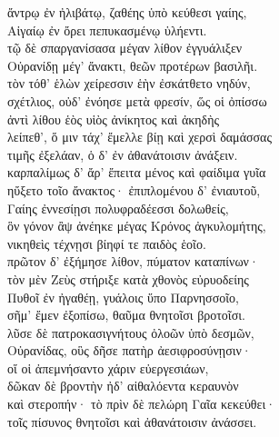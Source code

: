 \begin{pages}
\begin{Leftside}
ἄντρῳ ἐν ἠλιβάτῳ, ζαθέης ὑπὸ κεύθεσι γαίης,\\
Αἰγαίῳ ἐν ὄρει πεπυκασμένῳ ὑλήεντι.\\
τῷ δὲ σπαργανίσασα μέγαν λίθον ἐγγυάλιξεν \\
Οὐρανίδῃ μέγ' ἄνακτι, θεῶν προτέρων βασιλῆι.\\
τὸν τόθ' ἑλὼν χείρεσσιν ἑὴν ἐσκάτθετο νηδύν, \\
σχέτλιος, οὐδ' ἐνόησε μετὰ φρεσίν, ὥς οἱ ὀπίσσω \\
ἀντὶ λίθου ἑὸς υἱὸς ἀνίκητος καὶ ἀκηδὴς\\
λείπεθ', ὅ μιν τάχ' ἔμελλε βίῃ καὶ χερσὶ δαμάσσας \\
τιμῆς ἐξελάαν, ὁ δ' ἐν ἀθανάτοισιν ἀνάξειν. \\

\quad{}καρπαλίμως δ' ἄρ' ἔπειτα μένος καὶ φαίδιμα γυῖα\\
ηὔξετο τοῖο ἄνακτος· ἐπιπλομένου δ' ἐνιαυτοῦ, \\
Γαίης ἐννεσίῃσι πολυφραδέεσσι δολωθείς, \\
ὃν γόνον ἂψ ἀνέηκε μέγας Κρόνος ἀγκυλομήτης,  \\
νικηθεὶς τέχνῃσι βίηφί τε παιδὸς ἑοῖο.\\
πρῶτον δ' ἐξήμησε λίθον, πύματον καταπίνων·\\
τὸν μὲν Ζεὺς στήριξε κατὰ χθονὸς εὐρυοδείης\\
Πυθοῖ ἐν ἠγαθέῃ, γυάλοις ὕπο Παρνησσοῖο, \\
σῆμ' ἔμεν ἐξοπίσω, θαῦμα θνητοῖσι βροτοῖσι.  \\

\quad{}λῦσε δὲ πατροκασιγνήτους ὀλοῶν ὑπὸ δεσμῶν, \\
Οὐρανίδας, οὓς δῆσε πατὴρ ἀεσιφροσύνῃσιν· \\
οἵ οἱ ἀπεμνήσαντο χάριν εὐεργεσιάων,\\
δῶκαν δὲ βροντὴν ἠδ' αἰθαλόεντα κεραυνὸν\\
καὶ στεροπήν· τὸ πρὶν δὲ πελώρη Γαῖα κεκεύθει·  \\
τοῖς πίσυνος θνητοῖσι καὶ ἀθανάτοισιν ἀνάσσει.\\


\end{Leftside}
\end{pages}
